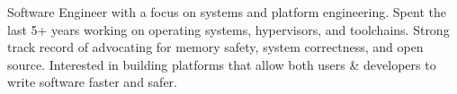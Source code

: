 
\begin{cvparagraph}
  Software Engineer with a focus on systems and platform engineering. Spent the last 5+ years working on operating systems, hypervisors, and toolchains. Strong track record of advocating for memory safety, system correctness, and open source. Interested in building platforms that allow both users \& developers to write software faster and safer.
\end{cvparagraph}
